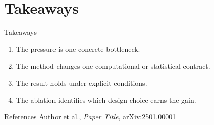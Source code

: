 \documentclass[aspectratio=169,10pt]{beamer}
\newcommand{\paperlink}[2]{\href{#2}{#1}}
\newcommand{\arxivcite}[1]{\paperlink{arXiv:#1}{https://arxiv.org/abs/#1}}
\newcommand{\stdcite}[3]{#1, \emph{#2}, \arxivcite{#3}}
\newcommand{\cExample}{\stdcite{Author et al.}{Paper Title}{2501.00001}}
\begin{document}
\section{Takeaways}

\begin{frame}{Takeaways}
  \vspace{0.6cm}
  \begin{enumerate}
    \item The pressure is one concrete bottleneck.
    \item The method changes one computational or statistical contract.
    \item The result holds under explicit conditions.
    \item The ablation identifies which design choice earns the gain.
  \end{enumerate}
\end{frame}

\begin{frame}{References}
  \scriptsize
  \cExample
\end{frame}
\end{document}
